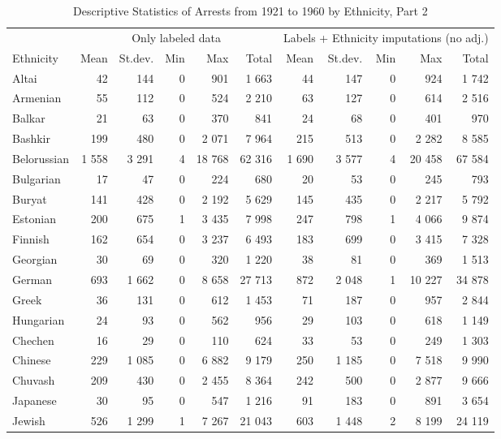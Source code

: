 \begin{table}[!h]

\caption{\label{tab:descr_stats_by_ethnicity}Descriptive Statistics of Arrests from 1921 to 1960 by Ethnicity, Part 2}
\centering
\fontsize{8}{10}\selectfont
\begin{tabular}{lrrrrrrrrrr}
\toprule
\multicolumn{1}{c}{ } & \multicolumn{5}{c}{Only labeled data} & \multicolumn{5}{c}{Labels + Ethnicity imputations (no adj.)} \\
\cmidrule(l{2pt}r{2pt}){2-6} \cmidrule(l{2pt}r{2pt}){7-11}
Ethnicity & Mean & St.dev. & Min & Max & Total & Mean & St.dev. & Min & Max & Total\\
\midrule
Altai & 42 & 144 & 0 & 901 & 1 663 & 44 & 147 & 0 & 924 & 1 742\\
Armenian & 55 & 112 & 0 & 524 & 2 210 & 63 & 127 & 0 & 614 & 2 516\\
Balkar & 21 & 63 & 0 & 370 & 841 & 24 & 68 & 0 & 401 & 970\\
Bashkir & 199 & 480 & 0 & 2 071 & 7 964 & 215 & 513 & 0 & 2 282 & 8 585\\
Belorussian & 1 558 & 3 291 & 4 & 18 768 & 62 316 & 1 690 & 3 577 & 4 & 20 458 & 67 584\\
Bulgarian & 17 & 47 & 0 & 224 & 680 & 20 & 53 & 0 & 245 & 793\\
Buryat & 141 & 428 & 0 & 2 192 & 5 629 & 145 & 435 & 0 & 2 217 & 5 792\\
Estonian & 200 & 675 & 1 & 3 435 & 7 998 & 247 & 798 & 1 & 4 066 & 9 874\\
Finnish & 162 & 654 & 0 & 3 237 & 6 493 & 183 & 699 & 0 & 3 415 & 7 328\\
Georgian & 30 & 69 & 0 & 320 & 1 220 & 38 & 81 & 0 & 369 & 1 513\\
German & 693 & 1 662 & 0 & 8 658 & 27 713 & 872 & 2 048 & 1 & 10 227 & 34 878\\
Greek & 36 & 131 & 0 & 612 & 1 453 & 71 & 187 & 0 & 957 & 2 844\\
Hungarian & 24 & 93 & 0 & 562 & 956 & 29 & 103 & 0 & 618 & 1 149\\
Chechen & 16 & 29 & 0 & 110 & 624 & 33 & 53 & 0 & 249 & 1 303\\
Chinese & 229 & 1 085 & 0 & 6 882 & 9 179 & 250 & 1 185 & 0 & 7 518 & 9 990\\
Chuvash & 209 & 430 & 0 & 2 455 & 8 364 & 242 & 500 & 0 & 2 877 & 9 666\\
Japanese & 30 & 95 & 0 & 547 & 1 216 & 91 & 183 & 0 & 891 & 3 654\\
Jewish & 526 & 1 299 & 1 & 7 267 & 21 043 & 603 & 1 448 & 2 & 8 199 & 24 119\\

\end{tabular}
\end{table}
